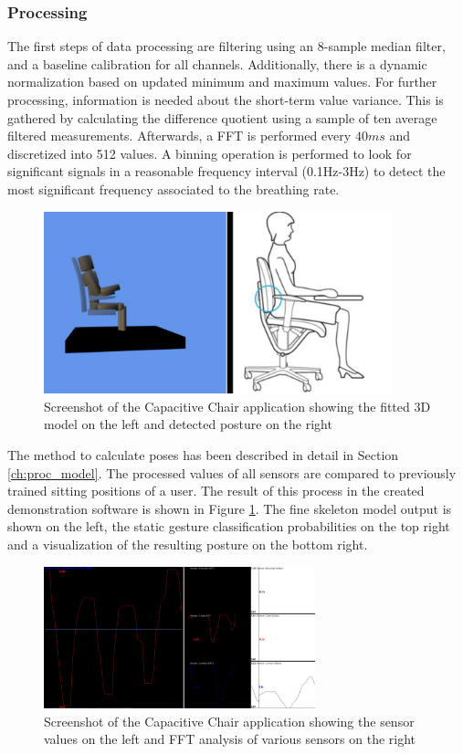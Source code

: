 \subsubsection{Processing}
The first steps of data processing are filtering using an 8-sample median filter, and a baseline calibration for all channels. Additionally, there is a dynamic normalization based on updated minimum and maximum values. For further processing, information is needed about the short-term value variance. This is gathered by calculating the difference quotient using a sample of ten average filtered measurements. Afterwards, a FFT is performed every $40ms$ and discretized into 512 values. A binning operation is performed to look for significant signals in a reasonable frequency interval (0.1Hz-3Hz) to detect the most significant frequency associated to the breathing rate. 

\begin{figure}[ht]
\centering
\includegraphics[width=0.9\textwidth]{images/smartchair_posture_software}
\caption{Screenshot of the Capacitive Chair application showing the fitted 3D model on the left and detected posture on the right}
\label{fig:smartchair_posture_software}
\end{figure}

The method to calculate poses has been described in detail in Section \ref{ch:proc_model}. The processed values of all sensors are compared to previously trained sitting positions of a user. The result of this process in the created demonstration software is shown in Figure \ref{fig:smartchair_posture_software}. The fine skeleton model output is shown on the left, the static gesture classification probabilities on the top right and a visualization of the resulting posture on the bottom right.

\begin{figure}[ht]
\centering
\includegraphics[width=0.7\textwidth]{images/smartchair_breathing_software}
\caption{Screenshot of the Capacitive Chair application showing the sensor values on the left and FFT analysis of various sensors on the right}
\label{fig:smartchair_breathing_software}
\end{figure}

